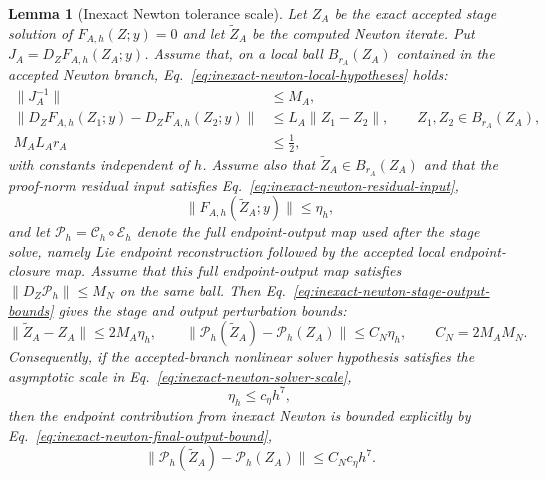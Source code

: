 \documentclass[preprint,12pt]{elsarticle}
\newtheorem{lemma}{Lemma}
\begin{document}
\begin{lemma}[Inexact Newton tolerance scale]
\label{lem:inexact-newton}
Let $Z_A$ be the exact accepted stage solution of $F_{A,h}(Z;y)=0$ and let
$\widetilde Z_A$ be the computed Newton iterate. Put
$J_A=D_ZF_{A,h}(Z_A;y)$. Assume that, on a local ball
$B_{r_A}(Z_A)$ contained in the accepted Newton branch,
Eq.~\eqref{eq:inexact-newton-local-hypotheses} holds:
\begin{equation}
\label{eq:inexact-newton-local-hypotheses}
\begin{aligned}
  \|J_A^{-1}\|&\le M_A,\\
  \|D_ZF_{A,h}(Z_1;y)-D_ZF_{A,h}(Z_2;y)\|
    &\le L_A\|Z_1-Z_2\|,\qquad Z_1,Z_2\in B_{r_A}(Z_A),\\
  M_A L_A r_A&\le \frac12 ,
\end{aligned}
\end{equation}
with constants independent of $h$. Assume also that
$\widetilde Z_A\in B_{r_A}(Z_A)$ and
that the proof-norm residual input satisfies
Eq.~\eqref{eq:inexact-newton-residual-input},
\begin{equation}
\label{eq:inexact-newton-residual-input}
  \|F_{A,h}(\widetilde Z_A;y)\| \le \eta_h ,
\end{equation}
and let
\(\mathcal P_h=\mathcal C_h\circ\mathcal E_h\) denote the full endpoint-output
map used after the stage solve, namely Lie endpoint reconstruction followed
by the accepted local endpoint-closure map. Assume that this full
endpoint-output map satisfies
\(\|D_Z\mathcal P_h\|\le M_N\) on the same ball. Then
Eq.~\eqref{eq:inexact-newton-stage-output-bounds} gives the stage and output
perturbation bounds:
\begin{equation}
\label{eq:inexact-newton-stage-output-bounds}
  \|\widetilde Z_A-Z_A\|\le 2M_A\eta_h,\qquad
  \|\mathcal P_h(\widetilde Z_A)-\mathcal P_h(Z_A)\|
  \le C_N\eta_h,\qquad C_N=2M_AM_N .
\end{equation}
Consequently, if the accepted-branch nonlinear solver hypothesis satisfies
the asymptotic scale in Eq.~\eqref{eq:inexact-newton-solver-scale},
\begin{equation}
\label{eq:inexact-newton-solver-scale}
  \eta_h\le c_\eta h^7 ,
\end{equation}
then the endpoint contribution from inexact Newton is bounded explicitly by
Eq.~\eqref{eq:inexact-newton-final-output-bound},
\begin{equation}
\label{eq:inexact-newton-final-output-bound}
  \|\mathcal P_h(\widetilde Z_A)-\mathcal P_h(Z_A)\|
  \le C_Nc_\eta h^7 .

\end{equation}
\end{lemma}
\end{document}
